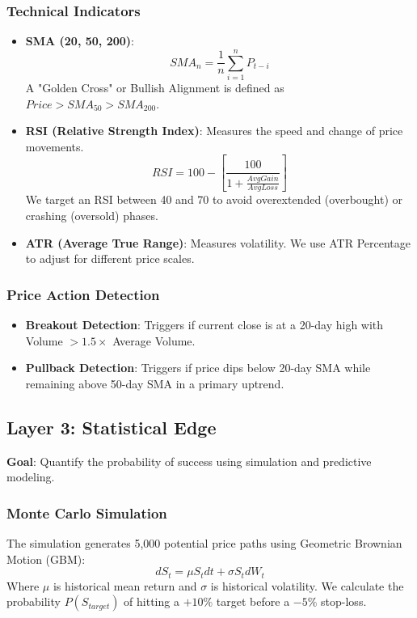 \documentclass{article}
\begin{document}
\subsubsection{Technical Indicators}
\begin{itemize}
    \item \textbf{SMA (20, 50, 200)}: 
    \begin{equation}
    SMA_{n} = \frac{1}{n} \sum_{i=1}^{n} P_{t-i}
    \end{equation}
    A "Golden Cross" or Bullish Alignment is defined as $Price > SMA_{50} > SMA_{200}$.
    \item \textbf{RSI (Relative Strength Index)}: Measures the speed and change of price movements. 
    \begin{equation}
    RSI = 100 - \left[ \frac{100}{1 + \frac{AvgGain}{AvgLoss}} \right]
    \end{equation}
    We target an RSI between 40 and 70 to avoid overextended (overbought) or crashing (oversold) phases.
    \item \textbf{ATR (Average True Range)}: Measures volatility. We use ATR Percentage to adjust for different price scales.
\end{itemize}

\subsubsection{Price Action Detection}
\begin{itemize}
    \item \textbf{Breakout Detection}: Triggers if current close is at a 20-day high with Volume $> 1.5 \times$ Average Volume.
    \item \textbf{Pullback Detection}: Triggers if price dips below 20-day SMA while remaining above 50-day SMA in a primary uptrend.
\end{itemize}

\subsection{Layer 3: Statistical Edge}
\textbf{Goal}: Quantify the probability of success using simulation and predictive modeling.
\subsubsection{Monte Carlo Simulation}
The simulation generates 5,000 potential price paths using Geometric Brownian Motion (GBM):
\begin{equation}
dS_t = \mu S_t dt + \sigma S_t dW_t
\end{equation}
Where $\mu$ is historical mean return and $\sigma$ is historical volatility. We calculate the probability $P(S_{target})$ of hitting a $+10\%$ target before a $-5\%$ stop-loss.
\end{document}
